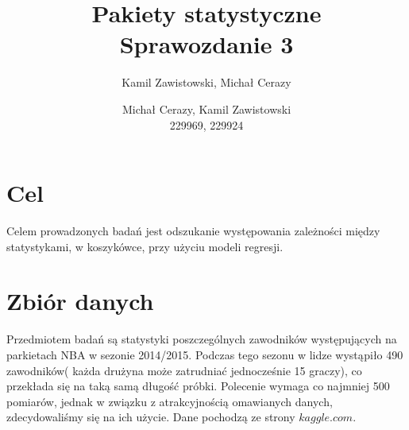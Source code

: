 \documentclass[11pt,a4paper]{article}
\author{Kamil Zawistowski, Michał Cerazy}
\begin{document}
\title{Pakiety statystyczne \\ Sprawozdanie 3}
\author{Michał Cerazy, Kamil Zawistowski \\ 229969, 229924}
\maketitle
\newpage
\tableofcontents
\newpage
\section{Cel}
Celem prowadzonych badań jest odszukanie występowania zależności między statystykami, w koszykówce, przy użyciu modeli regresji. 

\section{Zbiór danych}
Przedmiotem badań są statystyki poszczególnych zawodników występujących na parkietach NBA w sezonie 2014/2015. Podczas tego sezonu w lidze wystąpiło 490 zawodników( każda drużyna może zatrudniać jednocześnie 15 graczy), co przekłada się na taką samą długość próbki. Polecenie wymaga co najmniej 500 pomiarów, jednak w związku z atrakcyjnością omawianych danych, zdecydowaliśmy się na ich użycie. Dane pochodzą ze strony $kaggle.com$. 
\end{document}
